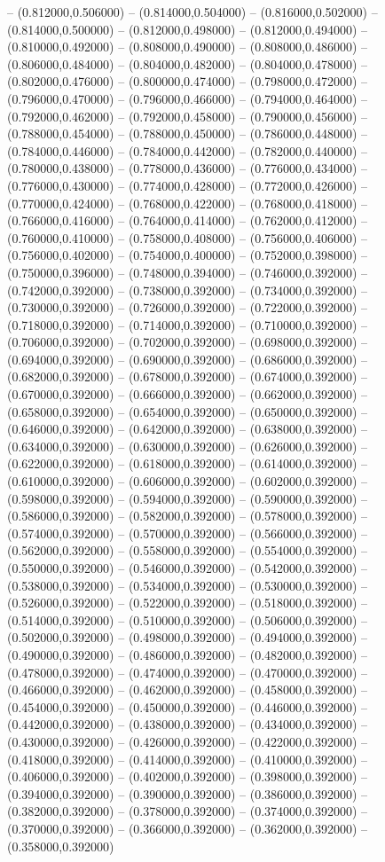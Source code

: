 -- (0.812000,0.506000) -- (0.814000,0.504000) -- (0.816000,0.502000) -- (0.814000,0.500000) -- (0.812000,0.498000) -- (0.812000,0.494000) -- (0.810000,0.492000) -- (0.808000,0.490000) -- (0.808000,0.486000) -- (0.806000,0.484000) -- (0.804000,0.482000) -- (0.804000,0.478000) -- (0.802000,0.476000) -- (0.800000,0.474000) -- (0.798000,0.472000) -- (0.796000,0.470000) -- (0.796000,0.466000) -- (0.794000,0.464000) -- (0.792000,0.462000) -- (0.792000,0.458000) -- (0.790000,0.456000) -- (0.788000,0.454000) -- (0.788000,0.450000) -- (0.786000,0.448000) -- (0.784000,0.446000) -- (0.784000,0.442000) -- (0.782000,0.440000) -- (0.780000,0.438000) -- (0.778000,0.436000) -- (0.776000,0.434000) -- (0.776000,0.430000) -- (0.774000,0.428000) -- (0.772000,0.426000) -- (0.770000,0.424000) -- (0.768000,0.422000) -- (0.768000,0.418000) -- (0.766000,0.416000) -- (0.764000,0.414000) -- (0.762000,0.412000) -- (0.760000,0.410000) -- (0.758000,0.408000) -- (0.756000,0.406000) -- (0.756000,0.402000) -- (0.754000,0.400000) -- (0.752000,0.398000) -- (0.750000,0.396000) -- (0.748000,0.394000) -- (0.746000,0.392000) -- (0.742000,0.392000) -- (0.738000,0.392000) -- (0.734000,0.392000) -- (0.730000,0.392000) -- (0.726000,0.392000) -- (0.722000,0.392000) -- (0.718000,0.392000) -- (0.714000,0.392000) -- (0.710000,0.392000) -- (0.706000,0.392000) -- (0.702000,0.392000) -- (0.698000,0.392000) -- (0.694000,0.392000) -- (0.690000,0.392000) -- (0.686000,0.392000) -- (0.682000,0.392000) -- (0.678000,0.392000) -- (0.674000,0.392000) -- (0.670000,0.392000) -- (0.666000,0.392000) -- (0.662000,0.392000) -- (0.658000,0.392000) -- (0.654000,0.392000) -- (0.650000,0.392000) -- (0.646000,0.392000) -- (0.642000,0.392000) -- (0.638000,0.392000) -- (0.634000,0.392000) -- (0.630000,0.392000) -- (0.626000,0.392000) -- (0.622000,0.392000) -- (0.618000,0.392000) -- (0.614000,0.392000) -- (0.610000,0.392000) -- (0.606000,0.392000) -- (0.602000,0.392000) -- (0.598000,0.392000) -- (0.594000,0.392000) -- (0.590000,0.392000) -- (0.586000,0.392000) -- (0.582000,0.392000) -- (0.578000,0.392000) -- (0.574000,0.392000) -- (0.570000,0.392000) -- (0.566000,0.392000) -- (0.562000,0.392000) -- (0.558000,0.392000) -- (0.554000,0.392000) -- (0.550000,0.392000) -- (0.546000,0.392000) -- (0.542000,0.392000) -- (0.538000,0.392000) -- (0.534000,0.392000) -- (0.530000,0.392000) -- (0.526000,0.392000) -- (0.522000,0.392000) -- (0.518000,0.392000) -- (0.514000,0.392000) -- (0.510000,0.392000) -- (0.506000,0.392000) -- (0.502000,0.392000) -- (0.498000,0.392000) -- (0.494000,0.392000) -- (0.490000,0.392000) -- (0.486000,0.392000) -- (0.482000,0.392000) -- (0.478000,0.392000) -- (0.474000,0.392000) -- (0.470000,0.392000) -- (0.466000,0.392000) -- (0.462000,0.392000) -- (0.458000,0.392000) -- (0.454000,0.392000) -- (0.450000,0.392000) -- (0.446000,0.392000) -- (0.442000,0.392000) -- (0.438000,0.392000) -- (0.434000,0.392000) -- (0.430000,0.392000) -- (0.426000,0.392000) -- (0.422000,0.392000) -- (0.418000,0.392000) -- (0.414000,0.392000) -- (0.410000,0.392000) -- (0.406000,0.392000) -- (0.402000,0.392000) -- (0.398000,0.392000) -- (0.394000,0.392000) -- (0.390000,0.392000) -- (0.386000,0.392000) -- (0.382000,0.392000) -- (0.378000,0.392000) -- (0.374000,0.392000) -- (0.370000,0.392000) -- (0.366000,0.392000) -- (0.362000,0.392000) -- (0.358000,0.392000) 